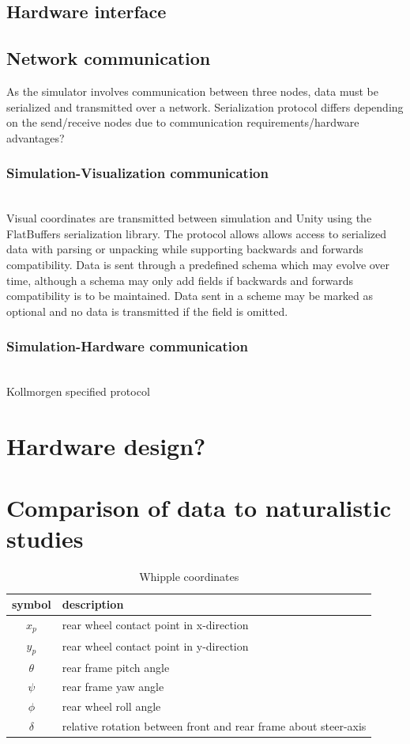 \documentclass[11pt,a4paper,reqno]{amsart}
\newcommand{\x}{x_{p}}
\newcommand{\y}{y_{p}}
\newcommand{\pitch}{\theta}
\newcommand{\yaw}{\psi}
\newcommand{\roll}{\phi}
\newcommand{\steer}{\delta}
\begin{document}
\subsection{Hardware interface}
\subsection{Network communication}
As the simulator involves communication between three nodes, data must be serialized and transmitted over a network.
Serialization protocol differs depending on the send/receive nodes due to communication requirements/hardware
advantages?
\subsubsection{Simulation-Visualization communication} \\
Visual coordinates are transmitted between simulation and Unity using the FlatBuffers serialization library.
The protocol allows allows access to serialized data with parsing or unpacking while supporting backwards and forwards
compatibility.
Data is sent through a predefined schema which may evolve over time, although a schema may only add fields if backwards
and forwards compatibility is to be maintained.
Data sent in a scheme may be marked as optional and no data is transmitted if the field is omitted.
\subsubsection{Simulation-Hardware communication} \\
Kollmorgen specified protocol

\section{Hardware design?}

\section{Comparison of data to naturalistic studies}

\begin{table}
    \centering
    \begin{tabular}{|c|l|}
        \hline
        symbol & description \\
        \hline
        $ \x $ & rear wheel contact point in x-direction \\
        $ \y $ & rear wheel contact point in y-direction \\
        $ \pitch $ & rear frame pitch angle \\
        $ \yaw $ & rear frame yaw angle \\
        $ \roll $ & rear wheel roll angle \\
        $ \steer $ & relative rotation between front and rear frame about steer-axis\\
        \hline
    \end{tabular}
    \caption{Whipple coordinates}
    \label{tab:coordinates}
\end{table}
\end{document}
